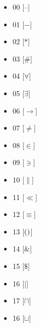 \documentclass[14pt]{article}
\begin{document}
  
                 \begin{itemize}  
                       \item 00 [--]   
                       \item 01 [$-$]   
                       \item 02 [$\ast$] 
                       \item 03 [$\#$] 
                       \item 04 [$\forall$]  
                       \item 05 [$\exists$]
                       \item 06 [$\rightarrow$] 
                       \item 07 [$\neq$] 
                       \item 08 [$\in$] 
                       \item 09 [$\ni$] 
                       \item 10 [$\parallel$]  
                       \item 11 [$\ll$] 
                       \item 12 [$\equiv$] 
                       \item 13 [$\\()$]  
                       \item 14 [$\&$]  
                       \item 15 [$\$$] 
                       \item 16 [$\mid$]  
                       \item 17 [$\sqcap$] 
                       \item 16 [$\sqcup$]  
                 \end{itemize}  
           
\end{document}
